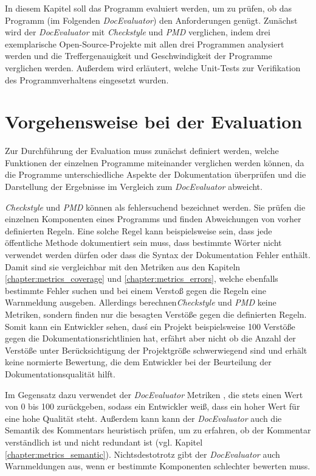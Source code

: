 \newcommand{\checkpmd}{\textit{Checkstyle} und \textit{PMD} }
\newcommand{\doceval}{\textit{DocEvaluator} }
In diesem Kapitel soll das Programm evaluiert werden, um zu prüfen, ob das Programm (im Folgenden \textit{DocEvaluator}) den Anforderungen genügt.  Zunächst wird der \textit{DocEvaluator} mit \checkpmd{} verglichen, indem drei exemplarische Open-Source-Projekte mit allen drei Programmen analysiert werden und die Treffergenauigkeit und Geschwindigkeit der Programme verglichen werden. Außerdem wird  erläutert, welche Unit-Tests zur Verifikation des Programmverhaltens eingesetzt wurden.
\section{Vorgehensweise bei der Evaluation}
Zur Durchführung der Evaluation muss zunächst definiert werden, welche Funktionen der einzelnen Programme miteinander verglichen werden können, da die Programme unterschiedliche Aspekte der Dokumentation überprüfen und die Darstellung der Ergebnisse im Vergleich zum \textit{DocEvaluator} abweicht.

\checkpmd können als fehlersuchend bezeichnet werden. Sie prüfen die einzelnen Komponenten eines Programms und finden Abweichungen von vorher definierten Regeln. Eine solche Regel kann beispielsweise sein, dass jede öffentliche Methode dokumentiert sein muss, dass bestimmte Wörter nicht verwendet werden dürfen oder dass die Syntax der Dokumentation Fehler enthält. Damit sind sie vergleichbar mit den Metriken aus den Kapiteln \ref{chapter:metrics_coverage}  und \ref{chapter:metrics_errors}, welche ebenfalls bestimmte Fehler suchen und bei einem Verstoß gegen die Regeln eine Warnmeldung ausgeben. Allerdings berechnen\checkpmd keine Metriken, sondern finden nur die besagten Verstöße gegen die definierten Regeln. Somit kann ein Entwickler sehen, dasś ein Projekt beispielsweise 100 Verstöße gegen die Dokumentationsrichtlinien hat, erfährt aber nicht ob die Anzahl der Verstöße unter Berücksichtigung der Projektgröße schwerwiegend sind und erhält keine normierte Bewertung, die dem Entwickler bei der Beurteilung der Dokumentationsqualität hilft. 

Im Gegensatz dazu verwendet der \doceval Metriken , die stets einen Wert von 0 bis 100 zurückgeben, sodass ein Entwickler weiß, dass ein hoher Wert für eine hohe Qualität steht. Außerdem kann kann der \doceval auch die Semantik des Kommentars heuristisch prüfen, um zu erfahren, ob der Kommentar verständlich ist und nicht redundant ist (vgl. Kapitel \ref{chapter:metrics_semantic}). Nichtsdestotrotz gibt der \doceval auch Warnmeldungen aus, wenn er bestimmte Komponenten schlechter bewerten muss.

